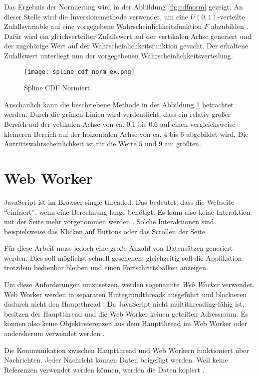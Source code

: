 Das Ergebnis der Normierung wird in der Abbildung \ref{fig:cdfnorm} gezeigt.
An dieser Stelle wird die Inversionsmethode verwendet, um eine $U(0,1)$-verteilte Zufallsvariable auf eine vorgegebene Wahrscheinlichkeitsfunktion $F$ abzubilden \cite{Inversionsmethode}. Dafür wird ein gleichverteilter Zufallswert auf der vertikalen Achse generiert und der zugehörige Wert auf der Wahrscheinlichkeitsfunktion gesucht. Der erhaltene Zufallswert unterliegt nun der vorgegebenen Wahrscheinlichkeitsverteilung.

\begin{figure}[H]
    \centering
    \texttt{[image: spline\_cdf\_norm\_ex.png]}
    \caption{Spline CDF Normiert}\label{fig:cdfnormex}
\end{figure}

Anschaulich kann die beschriebene Methode in der Abbildung \ref{fig:cdfnormex} betrachtet werden. Durch die grünen Linien wird verdeutlicht, dass ein relativ großer Bereich auf der vetikalen Achse von ca. $0.1$ bis $0.6$ auf einen vergleichsweise kleineren Bereich auf der hoizontalen Achse von ca. $4$ bis $6$ abgebildet wird. Die Autrittswahrscheinlichkeit ist für die Werte $5$ und $9$ am größten.

\section{Web Worker}
JavaScript ist im Browser single-threaded. Das bedeutet, dass die Webseite \enquote{einfriert}, wenn eine Berechnung lange benötigt. Es kann also keine Interaktion mit der Seite mehr vorgenommen werden \cite{googledev:webworkers}. Solche Interaktionen sind beispielsweise das Klicken auf Buttons oder das Scrollen der Seite.

Für diese Arbeit muss jedoch eine große Anzahl von Datensätzen generiert werden. Dies soll möglichst schnell geschehen; gleichzeitig soll die Applikation trotzdem bedienbar bleiben und einen Fortschrittsbalken anzeigen.

Um diese Anforderungen umzusetzen, werden sogenannte \textit{Web Worker} verwendet. Web Worker werden in separaten Hintegrundthreads ausgeführt und blockieren dadurch nicht den Hauptthread \cite{mdn:webworkers}. Da JavaScript nicht multithreading-fähig ist, besitzen der Hauptthread und die Web Worker keinen geteilten Adressraum. Es können also keine Objektreferenzen aus dem Hauptthread im Web Worker oder andersherum verwendet werden \cite{mdn:webworkers}.

Die Kommunikation zwischen Hauptthread und Web Workern funktioniert über Nachrichten. Jeder Nachricht können Daten beigefügt werden. Weil keine Referenzen verwendet werden können, werden die Daten kopiert \cite{mdn:webworkers}.

